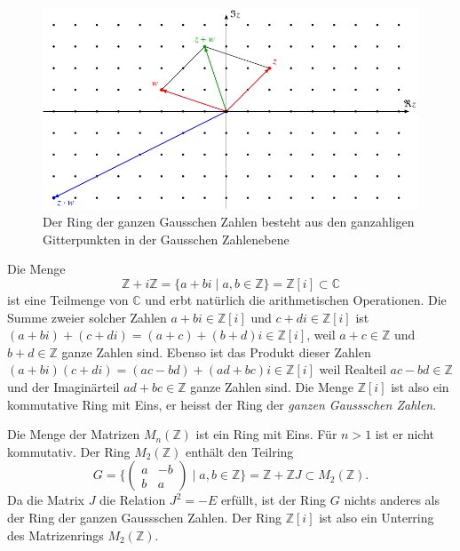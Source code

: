 \begin{beispiel}
\begin{figure}
\centering
\includegraphics{chapters/10-vektorenmatrizen/images/gausszahlen.pdf}
\caption{Der Ring der ganzen Gausschen Zahlen besteht aus den ganzahligen
Gitterpunkten in der Gausschen Zahlenebene
\label{buch:vektorenmatrizen:fig:ganzgauss}}
\end{figure}
Die Menge
\[
\mathbb{Z} + i\mathbb{Z}
=
\{a+bi\;|\; a,b\in\mathbb{Z}\}
=
\mathbb{Z}[i]
\subset
\mathbb{C}
\]
ist eine Teilmenge von $\mathbb{C}$ und erbt natürlich die 
arithmetischen Operationen.
Die Summe zweier solcher Zahlen $a+bi\in\mathbb{Z}[i]$ und
$c+di\in\mathbb{Z}[i]$ ist
$(a+bi)+(c+di)=(a+c) + (b+d)i\in \mathbb{Z}[i]$, weil $a+c\in\mathbb{Z}$
und $b+d\in\mathbb{Z}$ ganze Zahlen sind.
Ebenso ist das Produkt dieser Zahlen
\(
(a+bi)(c+di)
=
(ac-bd) + (ad+bc)i
\in \mathbb{Z}[i]
\)
weil Realteil $ac-bd\in\mathbb{Z}$ und der Imaginärteil $ad+bc\in\mathbb{Z}$
ganze Zahlen sind.
Die Menge $\mathbb{Z}[i]$ ist also ein kommutative Ring mit Eins, er
heisst der Ring der {\em ganzen Gaussschen Zahlen}.
%
\end{beispiel}

\begin{beispiel}
Die Menge der Matrizen $M_n(\mathbb{Z})$ ist ein Ring mit Eins.
Für $n>1$ ist er nicht kommutativ.
Der Ring $M_2(\mathbb{Z})$ enthält den Teilring
\[
G
=
\biggl\{
\begin{pmatrix}
a&-b\\b&a
\end{pmatrix}
\;\bigg|\;
a,b\in\mathbb{Z}
\biggr\}
=
\mathbb{Z}+ \mathbb{Z}J
\subset
M_2(\mathbb{Z}).
\]
Da die Matrix $J$ die Relation $J^2=-E$ erfüllt, ist der Ring $G$
nichts anderes als der Ring der ganzen Gaussschen Zahlen.
Der Ring $\mathbb{Z}[i]$ ist also ein Unterring des Matrizenrings
$M_2(\mathbb{Z})$.
\end{beispiel}

